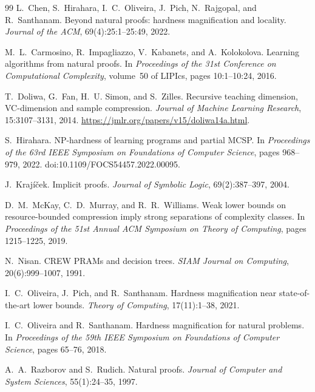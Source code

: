 \documentclass[11pt]{article}
\theoremstyle{definition}
\begin{document}
\begin{thebibliography}{99}
L.~Chen, S.~Hirahara, I.~C.~Oliveira, J.~Pich, N.~Rajgopal, and R.~Santhanam.
\newblock Beyond natural proofs: hardness magnification and locality.
\newblock \emph{Journal of the ACM}, 69(4):25:1--25:49, 2022.

M.~L.~Carmosino, R.~Impagliazzo, V.~Kabanets, and A.~Kolokolova.
\newblock Learning algorithms from natural proofs.
\newblock In \emph{Proceedings of the 31st Conference on Computational Complexity}, volume~50 of LIPIcs, pages 10:1--10:24, 2016.

T.~Doliwa, G.~Fan, H.~U. Simon, and S.~Zilles.
\newblock Recursive teaching dimension, VC-dimension and sample compression.
\newblock \emph{Journal of Machine Learning Research}, 15:3107--3131, 2014.
\newblock \url{https://jmlr.org/papers/v15/doliwa14a.html}.

S.~Hirahara.
\newblock NP-hardness of learning programs and partial MCSP.
\newblock In \emph{Proceedings of the 63rd IEEE Symposium on Foundations of Computer Science}, pages 968--979, 2022.
\newblock doi:10.1109/FOCS54457.2022.00095.

J.~Kraj\'i\v{c}ek.
\newblock Implicit proofs.
\newblock \emph{Journal of Symbolic Logic}, 69(2):387--397, 2004.

D.~M.~McKay, C.~D.~Murray, and R.~R.~Williams.
\newblock Weak lower bounds on resource-bounded compression imply strong separations of complexity classes.
\newblock In \emph{Proceedings of the 51st Annual ACM Symposium on Theory of Computing}, pages 1215--1225, 2019.

N.~Nisan.
\newblock CREW PRAMs and decision trees.
\newblock \emph{SIAM Journal on Computing}, 20(6):999--1007, 1991.

I.~C.~Oliveira, J.~Pich, and R.~Santhanam.
\newblock Hardness magnification near state-of-the-art lower bounds.
\newblock \emph{Theory of Computing}, 17(11):1--38, 2021.

I.~C.~Oliveira and R.~Santhanam.
\newblock Hardness magnification for natural problems.
\newblock In \emph{Proceedings of the 59th IEEE Symposium on Foundations of Computer Science}, pages 65--76, 2018.

A.~A.~Razborov and S.~Rudich.
\newblock Natural proofs.
\newblock \emph{Journal of Computer and System Sciences}, 55(1):24--35, 1997.

\end{thebibliography}
\end{document}
